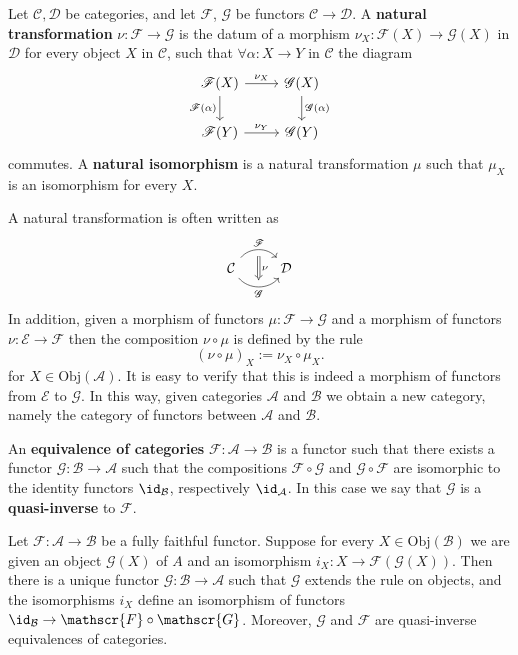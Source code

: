 \begin{definition}
Let $\mathcal{C}, \mathcal{D}$ be categories, and let $\mathscr{F}$, $\mathscr{G}$ be functors $\mathcal{C}\to\mathcal{D}$. A \textbf{natural transformation} $\nu:\mathscr{F}\to\mathscr{G}$ is the datum of a morphism $\nu_X:\mathscr{F}(X)\to\mathscr{G}(X)$ in $\mathcal{D}$ for every object $X$ in $\mathcal{C}$, such that $\forall\alpha:X\to Y$ in $\mathcal{C}$ the diagram
\[\begin{tikzcd}
\mathscr{F}(X)\ar[r,"\nu_X"]\ar[d,swap,"\mathscr{F}(\alpha)"]&\mathscr{G}(X)\ar[d,"\mathscr{G}(\alpha)"]\\
\mathscr{F}(Y)\ar[r,"\nu_Y"]&\mathscr{G}(Y)
\end{tikzcd}\]
commutes. A \textbf{natural isomorphism} is a natural transformation $\mu$ such that $\mu_X$ is an isomorphism for every $X$.
\end{definition}
A natural transformation is often written as
\[\begin{tikzcd}
\mathcal{C}\ar[r,bend left=50,"\mathscr{F}",""'{name=F,below}]\ar[r,bend right=50,swap,"\mathscr{G}",""'{name=G,above}]&\mathcal{D}
\arrow[Rightarrow,from=F,to=G,"\nu"]
\end{tikzcd}\]
In addition, given a morphism of functors $\mu:\mathscr{F}\to\mathscr{G}$ and a morphism of functors $\nu:\mathscr{E}\to\mathscr{F}$ then the composition $\nu\circ\mu$ is defined by the rule
\[(\nu\circ\mu)_X:=\nu_X\circ\mu_X.\]
for $X\in\mathrm{Obj}(\mathcal{A})$. It is easy to verify that this is indeed a morphism of functors from $\mathscr{E}$ to $\mathscr{G}$. In this way, given categories $\mathcal{A}$ and $\mathcal{B}$ we obtain a new category, namely
the category of functors between $\mathcal{A}$ and $\mathcal{B}$.
\begin{definition}
An \textbf{equivalence of categories} $\mathscr{F}:\mathcal{A}\to\mathcal{B}$ is a functor such that there exists a functor $\mathscr{G}:\mathcal{B}\to\mathcal{A}$ such that the compositions $\mathscr{F}\circ\mathscr{G}$ and $\mathscr{G}\circ\mathscr{F}$ are isomorphic to the identity functors $\id_{\mathcal{B}}$, respectively $\id_{\mathcal{A}}$. In this case we say that $\mathscr{G}$ is a \textbf{quasi-inverse} to $\mathscr{F}$.
\end{definition}
\begin{proposition}\label{equiv category iff}
Let $\mathscr{F}:\mathcal{A}\to\mathcal{B}$ be a fully faithful functor. Suppose for every $X\in\mathrm{Obj}(\mathcal{B})$ we are given an object $\mathscr{G}(X)$ of $A$ and an isomorphism $i_X:X\to\mathscr{F}(\mathscr{G}(X))$. Then there is a unique functor $\mathscr{G}:\mathcal{B}\to\mathcal{A}$ such that $\mathscr{G}$ extends the rule on objects, and the isomorphisms $i_X$ define an isomorphism of functors $\id_{\mathcal{B}}\to\mathscr{F}\circ\mathscr{G}$. Moreover, $\mathscr{G}$ and $\mathscr{F}$ are quasi-inverse equivalences of categories.
\end{proposition}
